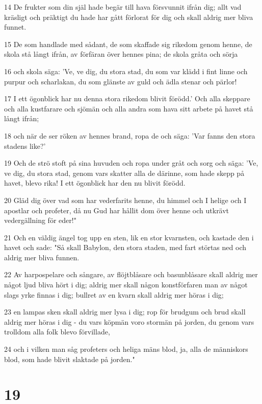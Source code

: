 \par 14 De frukter som din själ hade begär till hava försvunnit ifrån dig; allt vad kräsligt och präktigt du hade har gått förlorat för dig och skall aldrig mer bliva funnet.
\par 15 De som handlade med sådant, de som skaffade sig rikedom genom henne, de skola stå långt ifrån, av förfäran över hennes pina; de skola gråta och sörja
\par 16 och skola säga: 'Ve, ve dig, du stora stad, du som var klädd i fint linne och purpur och scharlakan, du som glänste av guld och ädla stenar och pärlor!
\par 17 I ett ögonblick har nu denna stora rikedom blivit förödd.' Och alla skeppare och alla kustfarare och sjömän och alla andra som hava sitt arbete på havet stå långt ifrån;
\par 18 och när de ser röken av hennes brand, ropa de och säga: 'Var fanns den stora stadens like?'
\par 19 Och de strö stoft på sina huvuden och ropa under gråt och sorg och säga: 'Ve, ve dig, du stora stad, genom vars skatter alla de därinne, som hade skepp på havet, blevo rika! I ett ögonblick har den nu blivit förödd.
\par 20 Gläd dig över vad som har vederfarits henne, du himmel och I helige och I apostlar och profeter, då nu Gud har hållit dom över henne och utkrävt vedergällning för eder!"
\par 21 Och en väldig ängel tog upp en sten, lik en stor kvarnsten, och kastade den i havet och sade: "Så skall Babylon, den stora staden, med fart störtas ned och aldrig mer bliva funnen.
\par 22 Av harpospelare och sångare, av flöjtblåsare och basunblåsare skall aldrig mer något ljud bliva hört i dig; aldrig mer skall någon konstförfaren man av något slags yrke finnas i dig; bullret av en kvarn skall aldrig mer höras i dig;
\par 23 en lampas sken skall aldrig mer lysa i dig; rop för brudgum och brud skall aldrig mer höras i dig - du vars köpmän voro stormän på jorden, du genom vars trolldom alla folk blevo förvillade,
\par 24 och i vilken man såg profeters och heliga mäns blod, ja, alla de människors blod, som hade blivit slaktade på jorden."

\chapter{19}

